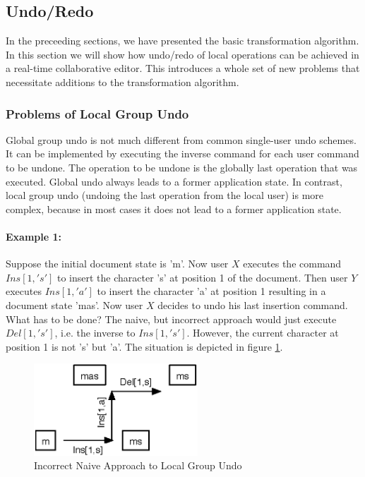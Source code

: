 \subsection{Undo/Redo}
In the preceeding sections, we have presented the basic transformation algorithm. In this section we will show how undo/redo of local operations can be achieved in a real-time collaborative editor. This introduces a whole set of new problems that necessitate additions to the transformation algorithm.

\subsubsection{Problems of Local Group Undo}
Global group undo is not much different from common single-user undo schemes. It can be implemented by executing the inverse command for each user command to be undone. The operation to be undone is the globally last operation that was executed. Global undo always leads to a former application state. In contrast, local group undo (undoing the last operation from the local user) is more complex, because in most cases it does not lead to a former application state.

\paragraph{Example 1:} Suppose the initial document state is 'm'. Now user $X$ executes the command $Ins[1,'s']$ to insert the character 's' at position 1 of the document. Then user $Y$ executes $Ins[1,'a']$ to insert the character 'a' at position 1 resulting in a document state 'mas'. Now user $X$ decides to undo his last insertion command. What has to be done? The naive, but incorrect approach would just execute $Del[1,'s']$, i.e. the inverse to $Ins[1,'s']$. However, the current character at position 1 is not 's' but 'a'. The situation is depicted in figure \ref{fig:concepts.naiveundo}.

\begin{figure}[htb]
 \centering
 \includegraphics[width=6.13cm,height=3.45cm]{../../images/concepts_naiveundo.eps}
 \caption{Incorrect Naive Approach to Local Group Undo}
 \label{fig:concepts.naiveundo}
\end{figure}


